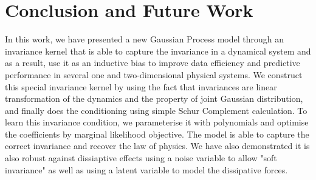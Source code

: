 \documentclass{statsmsc}
\begin{document}
\chapter{Conclusion and Future Work}
In this work, we have presented a new Gaussian Process model through an invariance kernel that is able to capture the invariance in a dynamical system and as a result, use it as an inductive bias to improve data efficiency and predictive performance in several one and two-dimensional physical systems. 
We construct this special invariance kernel by using the fact that invariances are linear transformation of the dynamics and the property of joint Gaussian distribution, and finally does the conditioning using simple Schur Complement calculation.
To learn this invariance condition, we parameterise it with polynomials and optimise the coefficients by marginal likelihood objective. 
The model is able to capture the correct invariance and recover the law of physics.
We have also demonstrated it is also robust against dissiaptive effects using a noise variable to allow "soft invariance" as well as using a latent variable to model the dissipative forces. 
\end{document}
